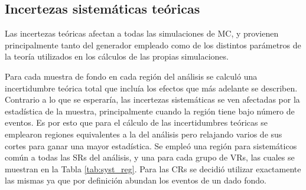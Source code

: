\subsection{Incertezas sistemáticas teóricas}

Las incertezas teóricas afectan a todas las simulaciones de MC, y provienen principalmente tanto del generador empleado como de los distintos parámetros de la teoría utilizados en los cálculos de las propias simulaciones. 

Para cada muestra de fondo en cada región del análisis se calculó una incertidumbre teórica total que incluía los efectos que más adelante se describen. Contrario a lo que se esperaría, las incertezas sistemáticas se ven afectadas por la estadística de la muestra, principalmente cuando la región tiene bajo número de eventos. Es por esto que para el cálculo de las incertidumbres teóricas se emplearon regiones equivalentes a la del análisis pero relajando varios de sus cortes para ganar una mayor estadística. Se empleó una región para sistemáticos común a todas las SRs del análisis, y una para cada grupo de VRs, las cuales se muestran en la Tabla \ref{tab:syst_reg}. Para las CRs se decidió utilizar exactamente las mismas ya que por definición abundan los eventos de un dado fondo. 

\begin{table}[ht!]
  \caption{Regiones empleadas para el cálculo de los sistemáticos teóricos. Las mismas fueron obtenidas a partir de las regiones del análisis pero relajando algunos de sus cortes. Para las CRs se emplearon las mismas regiones del análisis por lo que no se muestran.}
  \centering
\label{tab:syst_reg}
\end{table}

